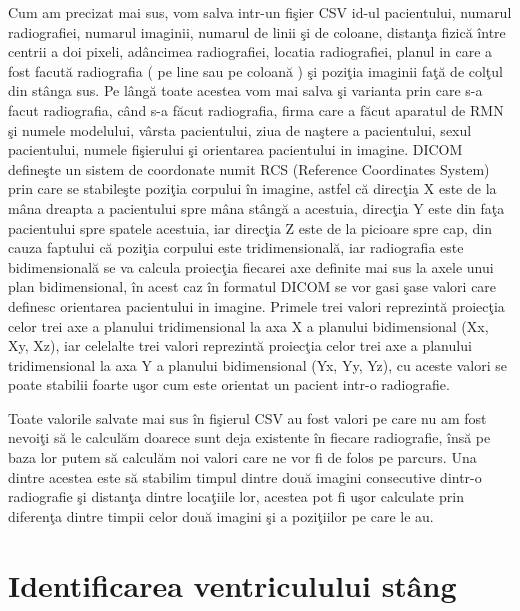 Cum am precizat mai sus, vom salva intr-un fi\c{s}ier CSV id-ul pacientului, numarul radiografiei, numarul imaginii, numarul de linii \c{s}i de coloane, distan\c{t}a fizic\u{a} \^{i}ntre centrii a doi pixeli, ad\^{a}ncimea radiografiei, locatia radiografiei, planul in care a fost facut\u{a} radiografia ( pe line sau pe coloan\u{a} ) \c{s}i pozi\c{t}ia imaginii fa\c{t}\u{a} de col\c{t}ul din st\^{a}nga sus. Pe l\^{a}ng\u{a} toate acestea vom mai salva \c{s}i varianta prin care s-a facut radiografia, c\^{a}nd s-a f\u{a}cut radiografia, firma care a f\u{a}cut aparatul de RMN \c{s}i numele modelului, v\^{a}rsta pacientului, ziua de na\c{s}tere a pacientului, sexul pacientului, numele fi\c{s}ierului \c{s}i orientarea pacientului in imagine. DICOM define\c{s}te un sistem de coordonate numit RCS (Reference Coordinates System) prin care se stabile\c{s}te pozi\c{t}ia corpului  \^{i}n imagine, astfel c\u{a} direc\c{t}ia X este de la m\^{a}na dreapta a pacientului spre m\^{a}na st\^{a}ng\u{a} a acestuia, direc\c{t}ia Y este din fa\c{t}a pacientului spre spatele acestuia, iar direc\c{t}ia Z este de la picioare spre cap, din cauza faptului c\u{a} pozi\c{t}ia corpului este tridimensional\u{a}, iar radiografia este bidimensional\u{a} se va calcula proiec\c{t}ia fiecarei axe definite mai sus la axele unui plan bidimensional, \^{i}n acest caz \^{i}n formatul DICOM se vor gasi \c{s}ase valori care definesc orientarea pacientului in imagine. Primele trei valori reprezint\u{a} proiec\c{t}ia celor trei axe a planului tridimensional la axa X a planului bidimensional (Xx, Xy, Xz), iar celelalte trei valori reprezint\u{a} proiec\c{t}ia celor trei axe a planului tridimensional la axa Y a planului bidimensional (Yx, Yy, Yz), cu aceste valori se poate stabilii foarte u\c{s}or cum este orientat un pacient intr-o radiografie.

\par

Toate valorile salvate mai sus \^{i}n fi\c{s}ierul CSV au fost valori pe care nu am fost nevoi\c{t}i s\u{a} le calcul\u{a}m doarece sunt deja existente \^{i}n fiecare radiografie, \^{i}ns\u{a} pe baza lor putem s\u{a} calcul\u{a}m noi valori care ne vor fi de folos pe parcurs. Una dintre acestea este s\u{a} stabilim timpul dintre dou\u{a} imagini consecutive dintr-o radiografie \c{s}i distan\c{t}a dintre loca\c{t}iile lor, acestea pot fi u\c{s}or calculate prin diferen\c{t}a dintre timpii  celor dou\u{a} imagini \c{s}i a pozi\c{t}iilor pe care le au.

\section{Identificarea ventriculului st\^{a}ng}

